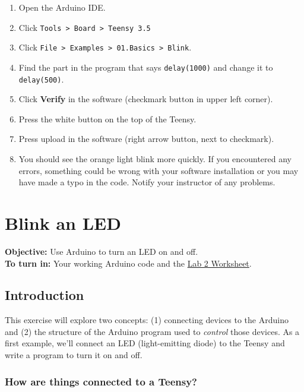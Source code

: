 \documentclass[]{book}
\providecommand{\tightlist}{%
  \setlength{\itemsep}{0pt}\setlength{\parskip}{0pt}}
\begin{document}
\begin{enumerate}
\def\labelenumi{\arabic{enumi}.}
\tightlist
\item
  Open the Arduino IDE.
\item
  Click \texttt{Tools\ \textgreater{}\ Board\ \textgreater{}\ Teensy\ 3.5}
\item
  Click \texttt{File\ \textgreater{}\ Examples\ \textgreater{}\ 01.Basics\ \textgreater{}\ Blink}.
\item
  Find the part in the program that says \texttt{delay(1000)} and change it to \texttt{delay(500)}.
\item
  Click \textbf{Verify} in the software (checkmark button in upper left corner).
\item
  Press the white button on the top of the Teensy.
\item
  Press upload in the software (right arrow button, next to checkmark).
\item
  You should see the orange light blink more quickly. If you encountered any errors, something could be wrong with your software installation or you may have made a typo in the code. Notify your instructor of any problems.
\end{enumerate}

\hypertarget{blink-an-led}{%
\chapter{Blink an LED}\label{blink-an-led}}

\textbf{Objective:} Use Arduino to turn an LED on and off.\\
\textbf{To turn in:} Your working Arduino code and the \href{https://github.com/alphonse/alphonse.github.io/raw/master/archive/chem191-f2019/pdf/lab2_Blink.pdf}{Lab 2 Worksheet}.

\hypertarget{introduction-1}{%
\section*{Introduction}\label{introduction-1}}

This exercise will explore two concepts: (1) connecting devices to the Arduino and (2) the structure of the Arduino program used to \emph{control} those devices. As a first example, we'll connect an LED (light-emitting diode) to the Teensy and write a program to turn it on and off.

\hypertarget{how-are-things-connected-to-a-teensy}{%
\subsection*{How are things connected to a Teensy?}\label{how-are-things-connected-to-a-teensy}}
\end{document}
